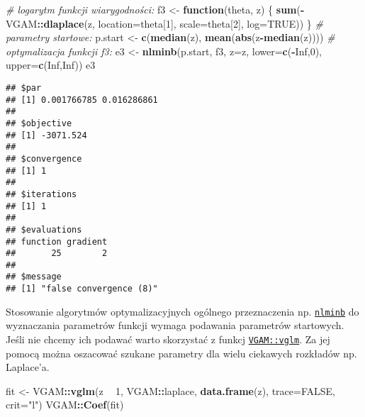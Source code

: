 \documentclass[polish,]{book}
\newenvironment{Shaded}{\begin{snugshade}}{\end{snugshade}}
\newcommand{\CommentTok}[1]{\textcolor[rgb]{0.56,0.35,0.01}{\textit{#1}}}
\newcommand{\ControlFlowTok}[1]{\textcolor[rgb]{0.13,0.29,0.53}{\textbf{#1}}}
\newcommand{\DataTypeTok}[1]{\textcolor[rgb]{0.13,0.29,0.53}{#1}}
\newcommand{\DecValTok}[1]{\textcolor[rgb]{0.00,0.00,0.81}{#1}}
\newcommand{\KeywordTok}[1]{\textcolor[rgb]{0.13,0.29,0.53}{\textbf{#1}}}
\newcommand{\NormalTok}[1]{#1}
\newcommand{\OperatorTok}[1]{\textcolor[rgb]{0.81,0.36,0.00}{\textbf{#1}}}
\newcommand{\OtherTok}[1]{\textcolor[rgb]{0.56,0.35,0.01}{#1}}
\newcommand{\StringTok}[1]{\textcolor[rgb]{0.31,0.60,0.02}{#1}}
\begin{document}
\begin{Shaded}
\begin{Highlighting}[]
\CommentTok{# logarytm funkcji wiarygodności:}
\NormalTok{f3 <-}\StringTok{ }\ControlFlowTok{function}\NormalTok{(theta, z) \{}
  \KeywordTok{sum}\NormalTok{(}\OperatorTok{-}\NormalTok{VGAM}\OperatorTok{::}\KeywordTok{dlaplace}\NormalTok{(z, }\DataTypeTok{location=}\NormalTok{theta[}\DecValTok{1}\NormalTok{], }\DataTypeTok{scale=}\NormalTok{theta[}\DecValTok{2}\NormalTok{], }\DataTypeTok{log=}\OtherTok{TRUE}\NormalTok{))}
\NormalTok{  \}}
\CommentTok{# parametry startowe:}
\NormalTok{p.start <-}\StringTok{ }\KeywordTok{c}\NormalTok{(}\KeywordTok{median}\NormalTok{(z), }\KeywordTok{mean}\NormalTok{(}\KeywordTok{abs}\NormalTok{(z}\OperatorTok{-}\KeywordTok{median}\NormalTok{(z))))}
\CommentTok{# optymalizacja funkcji f3:}
\NormalTok{e3 <-}\StringTok{ }\KeywordTok{nlminb}\NormalTok{(p.start, f3, }\DataTypeTok{z=}\NormalTok{z, }\DataTypeTok{lower=}\KeywordTok{c}\NormalTok{(}\OperatorTok{-}\OtherTok{Inf}\NormalTok{,}\DecValTok{0}\NormalTok{), }\DataTypeTok{upper=}\KeywordTok{c}\NormalTok{(}\OtherTok{Inf}\NormalTok{,}\OtherTok{Inf}\NormalTok{))}
\NormalTok{e3}
\end{Highlighting}
\end{Shaded}

\begin{verbatim}
## $par
## [1] 0.001766785 0.016286861
## 
## $objective
## [1] -3071.524
## 
## $convergence
## [1] 1
## 
## $iterations
## [1] 1
## 
## $evaluations
## function gradient 
##       25        2 
## 
## $message
## [1] "false convergence (8)"
\end{verbatim}

Stosowanie algorytmów optymalizacyjnych ogólnego przeznaczenia np. \href{https://rdrr.io/r/stats/nlminb.html}{\texttt{nlminb}} do wyznaczania parametrów funkcji
wymaga podawania parametrów startowych. Jeśli nie chcemy ich podawać
warto skorzystać z funkcj \href{https://rdrr.io/cran/VGAM/man/vglm.html}{\texttt{VGAM::vglm}}.
Za jej pomocą można oszacować szukane parametry dla wielu ciekawych rozkładów np. Laplace'a.

\begin{Shaded}
\begin{Highlighting}[]
\NormalTok{fit <-}\StringTok{ }\NormalTok{VGAM}\OperatorTok{::}\KeywordTok{vglm}\NormalTok{(z }\OperatorTok{~}\StringTok{ }\DecValTok{1}\NormalTok{, VGAM}\OperatorTok{::}\NormalTok{laplace, }\KeywordTok{data.frame}\NormalTok{(z), }\DataTypeTok{trace=}\OtherTok{FALSE}\NormalTok{, }\DataTypeTok{crit=}\StringTok{"l"}\NormalTok{)}
\NormalTok{VGAM}\OperatorTok{::}\KeywordTok{Coef}\NormalTok{(fit)}
\end{Highlighting}
\end{Shaded}
\end{document}
